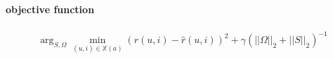 \documentclass{article}
\begin{document}
\paragraph{objective function}
\begin{gather}
    \arg_{S, \Omega} \min_{(u,i) \in \mathbb{X}(a)} \left(r(u,i) - \hat{r}(u,i) \right)^{2} + \gamma \left(||\Omega||_{2} +||S||_{2}\right)^{-1} \label{eq:obj_func}
\end{gather}
\end{document}
